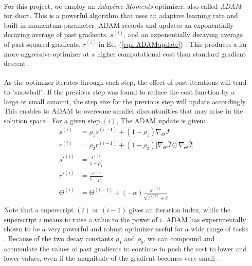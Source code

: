 \documentclass[12pt,letterpaper]{article}
\begin{document}
\paragraph*{}For this project, we employ an \textit{Adaptive-Moments} optimizer, also called \textit{ADAM} for short. This is a powerful algorithm that uses an adaptive learning rate and built-in momentum parameter. ADAM records and updates an exponentially decaying average of past gradients, $s^{(i)}$, and an exponentially decaying average of past squared gradients, $r^{(i)}$ in Eq. (\ref{eqn-ADAMupdate}) \cite{Geron}. This produces a far more aggressive optimizer at a higher computational cost than standard gradient descent \cite{Goodfellow}.

\paragraph*{}As the optimizer iterates through each step, the effect of past iterations will tend to "snowball". If the previous step was found to reduce the cost function by a large or small amount, the step size for the previous step will update accordingly. This enables to ADAM to overcome smaller discontunities that may arise in the solution space \cite{Goodfellow}. For a given step $(i)$, The ADAM update is given:
\begin{equation}
\label{eqn-ADAMupdate}
\begin{split}
s^{(i)} &= \rho_1 s^{(i-1)} + (1 - \rho_1) \nabla_{\Theta} \bar{J}  \\
r^{(i)} &= \rho_2 r^{(i-1)} + (1 - \rho_2) \Big[ \nabla_{\Theta} \bar{J} \odot \nabla_{\Theta} \bar{J} \Big]  \\
s'^{(i)} &= \frac{s^{(i)}}{1-\rho_1^i} \\
r'^{(i)} &= \frac{r^{(i)}}{1-\rho_2^i} \\
\Theta^{(i)} &= \Theta^{(i-1)} + (-\alpha)\frac{s'^{(i)}}{\sqrt{r'^{(i)}}+\delta} \\
\end{split}
\end{equation}
Note that a superscript $(i)$ or $(i-1)$ gives an iteration index, while the superscript $i$ means to raise a value to the power of $i$. ADAM has experimentally shown to be a very powerful and robust optimizer useful for a wide range of tasks \cite{Goodfellow}. Because of the two decay constants $\rho_1$ and $\rho_2$, we can compound and accumulate the values of past gradients to continue to push the cost to lower and lower values, even if the magnitude of the gradient becomes very small \cite{Geron}. 
\end{document}
